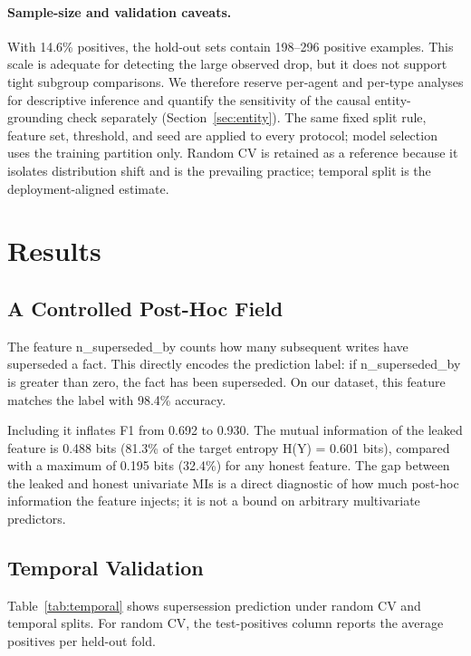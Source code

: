 \documentclass[sigconf,nonacm]{acmart}
\begin{document}
\paragraph{Sample-size and validation caveats.}
With 14.6\% positives, the hold-out sets contain 198--296 positive examples. This scale is adequate for detecting the large observed drop, but it does not support tight subgroup comparisons. We therefore reserve per-agent and per-type analyses for descriptive inference and quantify the sensitivity of the causal entity-grounding check separately (Section~\ref{sec:entity}). The same fixed split rule, feature set, threshold, and seed are applied to every protocol; model selection uses the training partition only. Random CV is retained as a reference because it isolates distribution shift and is the prevailing practice; temporal split is the deployment-aligned estimate.

\section{Results}
\label{sec:results}

\subsection{A Controlled Post-Hoc Field}
\label{sec:leakage}
The feature n\_superseded\_by counts how many subsequent writes have superseded a fact. This directly encodes the prediction label: if n\_superseded\_by is greater than zero, the fact has been superseded. On our dataset, this feature matches the label with 98.4\% accuracy.

Including it inflates F1 from 0.692 to 0.930. The mutual information of the leaked feature is 0.488 bits (81.3\% of the target entropy H(Y) = 0.601 bits), compared with a maximum of 0.195 bits (32.4\%) for any honest feature. The gap between the leaked and honest univariate MIs is a direct diagnostic of how much post-hoc information the feature injects; it is not a bound on arbitrary multivariate predictors.

\subsection{Temporal Validation}
\label{sec:temporal}

Table~\ref{tab:temporal} shows supersession prediction under random CV and temporal splits. For random CV, the test-positives column reports the average positives per held-out fold.
\end{document}
